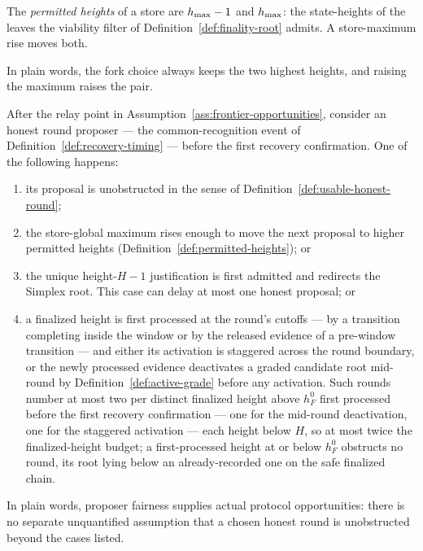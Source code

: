 \begin{definition}\label{def:permitted-heights}
The \emph{permitted heights} of a store are \(h_{\max}-1\) and \(h_{\max}\):
the state-heights of the leaves the viability filter of
Definition~\ref{def:finality-root} admits.  A store-maximum rise moves
both.

In plain words, the fork choice always keeps the two highest heights,
and raising the maximum raises the pair.
\end{definition}

\begin{lemma}
\label{lem:honest-proposer-coverage}
After the relay point in
Assumption~\ref{ass:frontier-opportunities}, consider an honest round
proposer --- the common-recognition event of
Definition~\ref{def:recovery-timing} --- before the first recovery
confirmation.  One of the following happens:
\begin{enumerate}
 \item its proposal is unobstructed in the sense of
   Definition~\ref{def:usable-honest-round};
 \item the store-global maximum rises enough to move the next proposal to
   higher permitted heights (Definition~\ref{def:permitted-heights}); or
 \item the unique height-\(H-1\) justification is first admitted and
   redirects the Simplex root.  This case can delay at most one honest
   proposal; or
 \item a finalized height is first processed at the round's cutoffs ---
   by a transition completing inside the window or by the released
   evidence of a pre-window transition --- and either its
   activation is staggered across the round boundary, or the newly
   processed evidence deactivates a graded candidate root mid-round by
   Definition~\ref{def:active-grade} before any activation.  Such rounds
   number at most two per distinct finalized height above \(h_F^0\)
   first processed before the first recovery confirmation --- one for
   the mid-round deactivation, one for the staggered activation ---
   each height below \(H\), so at most twice the finalized-height
   budget; a first-processed height at or below \(h_F^0\) obstructs
   no round, its root lying below an already-recorded one on the safe
   finalized chain.
\end{enumerate}
In plain words, proposer fairness supplies actual protocol opportunities:
there is no separate unquantified assumption that a chosen honest round
is unobstructed beyond the cases listed.
\end{lemma}

